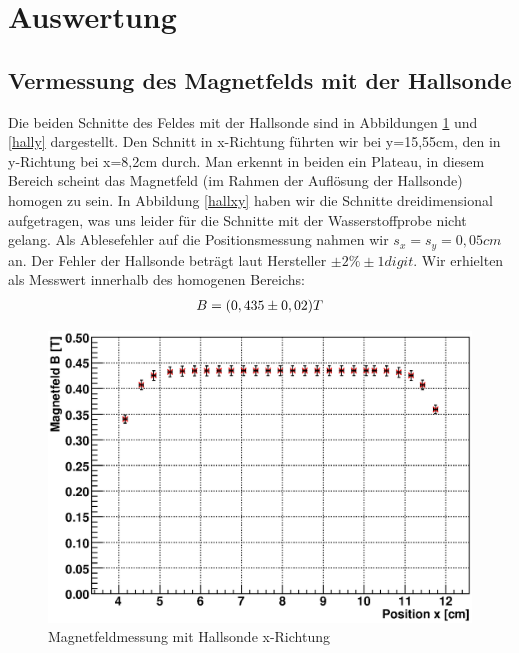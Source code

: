 \documentclass[12pt]{article}
\begin{document}
\section{Auswertung}
\subsection{Vermessung des Magnetfelds mit der Hallsonde}
Die beiden Schnitte des Feldes mit der Hallsonde sind in Abbildungen \ref{hallx} und \ref{hally} dargestellt. Den Schnitt in x-Richtung führten wir bei y=15,55cm, den in y-Richtung bei x=8,2cm durch. Man erkennt in beiden ein Plateau, in diesem Bereich scheint das Magnetfeld (im Rahmen der Auflösung der Hallsonde) homogen zu sein. In Abbildung \ref{hallxy} haben wir die Schnitte dreidimensional aufgetragen, was uns leider für die Schnitte mit der Wasserstoffprobe nicht gelang. Als Ablesefehler auf die Positionsmessung nahmen wir $s_x = s_y = 0,05cm$ an. Der Fehler der Hallsonde beträgt laut Hersteller $\pm 2\% \pm 1digit$. Wir erhielten als Messwert innerhalb des homogenen Bereichs:
\begin{align}
 \notag B=(0,435 \pm 0,02) T
\end{align}

\begin{figure}[H]
\centering
\includegraphics[width=0.9\linewidth]{pictures/hallsonde_x.eps}
\caption{Magnetfeldmessung mit Hallsonde x-Richtung}
\label{hallx}
\end{figure}
\end{document}
